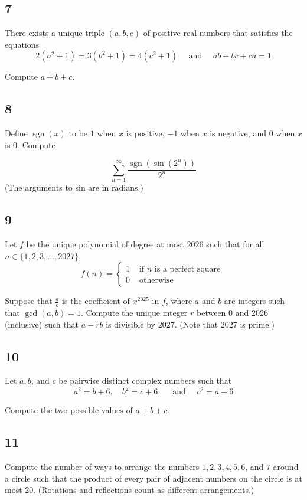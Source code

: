 \subsection{7}
There exists a unique triple $(a, b, c)$ of positive real numbers that satisfies the equations
$$
2\left(a^{2}+1\right)=3\left(b^{2}+1\right)=4\left(c^{2}+1\right) \quad \text { and } \quad a b+b c+c a=1
$$

Compute $a+b+c$.

\subsection{8}
Define $\operatorname{sgn}(x)$ to be $1$ when $x$ is positive, $-1$ when $x$ is negative, and $0$ when $x$ is $0$. Compute

$$
\sum_{n=1}^{\infty} \frac{\operatorname{sgn}\left(\sin \left(2^{n}\right)\right)}{2^{n}}
$$
(The arguments to sin are in radians.)

\subsection{9}
Let $f$ be the unique polynomial of degree at most $2026$ such that for all $n \in\{1,2,3, \ldots, 2027\}$,
$$
f(n)= \begin{cases}1 & \text { if } n \text { is a perfect square } \\ 0 & \text { otherwise }\end{cases}
$$

Suppose that $\frac{a}{b}$ is the coefficient of $x^{2025}$ in $f$, where $a$ and $b$ are integers such that $\operatorname{gcd}(a, b)=1$. Compute the unique integer $r$ between $0$ and $2026$ (inclusive) such that $a-r b$ is divisible by $2027$. (Note that $2027$ is prime.)

\subsection{10}
Let $a, b$, and $c$ be pairwise distinct complex numbers such that
$$
a^{2}=b+6, \quad b^{2}=c+6, \quad \text { and } \quad c^{2}=a+6
$$

Compute the two possible values of $a+b+c$.

\subsection{11}
Compute the number of ways to arrange the numbers $1,2,3,4,5,6$, and $7$ around a circle such that the product of every pair of adjacent numbers on the circle is at most 20. (Rotations and reflections count as different arrangements.)

